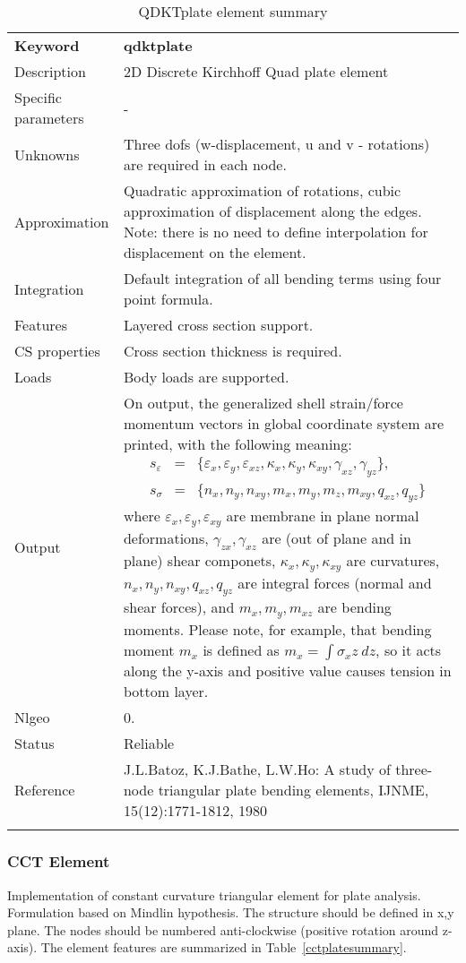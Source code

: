 \documentclass[a4paper]{article}
\newcommand{\param}[1]{\texttt{#1}} %
\newcommand{\templabel}{}%
\newcommand{\tempcaption}{}%
\newcounter{nelpar}
\newenvironment{elementsummary}[5]{%
  \gdef\tempcaption{#4}%
  \gdef\templabel{#5}%
  \setcounter{nelpar}{0}%
  \begin{center} %
    \begin{table}[!htb] %
      \begin{tabular}{|l|p{9cm}|}\hline %
        {\bf Keyword} & \bf{#1}\\ %
        {Description} & {#2}\\ %
        {Specific parameters} & {#3}\\ \hline %
}{
  \\ \hline %
      \end{tabular}%
      \caption{\tempcaption}%
      \label{\templabel}%
    \end{table}%
  \end{center}%
}
\newcommand{\elementParam}[1]{%
  \ifthenelse{\value{nelpar}>0} %
             {&{#1}}%
             {\setcounter{nelpar}{1}Parameters&{#1}}%
             \\%
}
\newcommand{\elementDescription}[2]{{#1} & {#2}\\ }
\begin{document}
\begin{elementsummary}{qdktplate}{2D Discrete Kirchhoff Quad plate element}{-}{QDKTplate element summary}{qdktplatesummary}
\elementDescription{Unknowns}{Three dofs (w-displacement, u and v - rotations) are required in each node.}
\elementDescription{Approximation}{Quadratic approximation of rotations, cubic approximation of displacement along the edges. Note: there is no need to define interpolation for displacement on the element.}
\elementDescription{Integration}{Default integration of all bending terms using four point formula.}
\elementDescription{Features}{Layered cross section support.}
\elementDescription{CS properties}{Cross section thickness is required.}
\elementDescription{Loads}{Body loads are supported.}
\elementDescription{Output}{On output, the generalized shell strain/force momentum vectors in global coordinate system are printed, with the following meaning:
\begin{eqnarray*}
s_{\varepsilon}&=&\{\varepsilon_x, \varepsilon_y, \varepsilon_{xz}, \kappa_x, \kappa_y, \kappa_{xy}, \gamma_{xz}, \gamma_{yz}\},\\
s_{\sigma}&=&\{n_x, n_y, n_{xy}, m_x, m_y, m_z, m_{xy}, q_{xz}, q_{yz}\}
\end{eqnarray*}
where $\varepsilon_x, \varepsilon_y, \varepsilon_{xy}$ are membrane in plane normal deformations, $\gamma_{zx}, \gamma_{xz}$ are (out of plane and in plane) shear componets, $\kappa_x, \kappa_y, \kappa_{xy}$ are curvatures, $n_x, n_y, n_{xy}, q_{xz}, q_{yz}$ are integral forces (normal and shear forces), and $m_x, m_y, m_{xz}$ are bending moments. 
Please note, for example, that bending moment $m_x$ is defined as $m_x=\int \sigma_x z\ dz$, so it acts along the y-axis and positive value causes tension in bottom layer.}
\elementDescription{Nlgeo}{0.}
\elementDescription{Status}{Reliable}
\elementDescription{Reference}{J.L.Batoz, K.J.Bathe, L.W.Ho: A study of three-node triangular plate bending elements, IJNME, 15(12):1771-1812, 1980}
\end{elementsummary}

\subsubsection {CCT Element}
\label{cct}
Implementation of constant curvature triangular element for plate
analysis. Formulation based on Mindlin hypothesis. The structure should be defined in x,y plane. 
The nodes should be numbered anti-clockwise (positive rotation around
z-axis). The element features are summarized in Table~\ref{cctplatesummary}.
\end{document}
